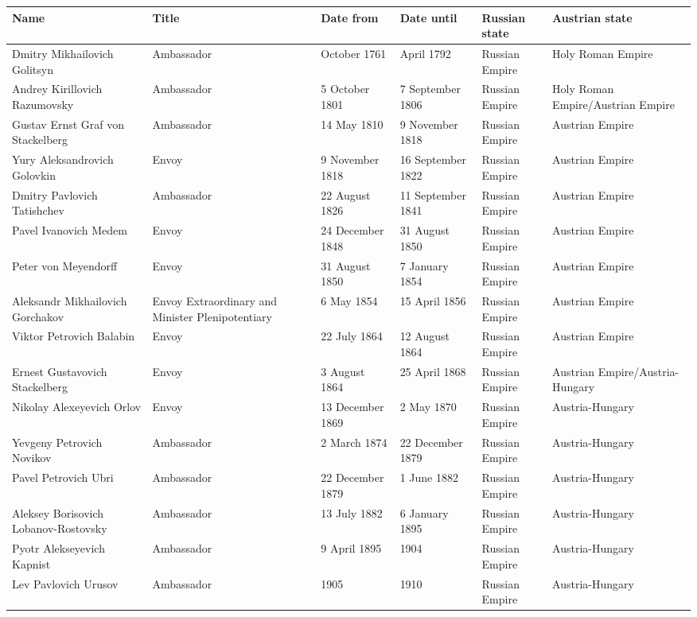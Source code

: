 \documentclass{article}
\begin{document}
\begin{tabular}{llllll}
\toprule
Name & Title & Date from & Date until & Russian state & Austrian state \\
\midrule
Dmitry Mikhailovich Golitsyn & Ambassador & October 1761 & April 1792 & Russian Empire & Holy Roman Empire \\
Andrey Kirillovich Razumovsky & Ambassador & 5 October 1801 & 7 September 1806 & Russian Empire & Holy Roman Empire/Austrian Empire \\
Gustav Ernst Graf von Stackelberg & Ambassador & 14 May 1810 & 9 November 1818 & Russian Empire & Austrian Empire \\
Yury Aleksandrovich Golovkin & Envoy & 9 November 1818 & 16 September 1822 & Russian Empire & Austrian Empire \\
Dmitry Pavlovich Tatishchev & Ambassador & 22 August 1826 & 11 September 1841 & Russian Empire & Austrian Empire \\
Pavel Ivanovich Medem & Envoy & 24 December 1848 & 31 August 1850 & Russian Empire & Austrian Empire \\
Peter von Meyendorff & Envoy & 31 August 1850 & 7 January 1854 & Russian Empire & Austrian Empire \\
Aleksandr Mikhailovich Gorchakov & Envoy Extraordinary and Minister Plenipotentiary & 6 May 1854 & 15 April 1856 & Russian Empire & Austrian Empire \\
Viktor Petrovich Balabin & Envoy & 22 July 1864 & 12 August 1864 & Russian Empire & Austrian Empire \\
Ernest Gustavovich Stackelberg & Envoy & 3 August 1864 & 25 April 1868 & Russian Empire & Austrian Empire/Austria-Hungary \\
Nikolay Alexeyevich Orlov & Envoy & 13 December 1869 & 2 May 1870 & Russian Empire & Austria-Hungary \\
Yevgeny Petrovich Novikov & Ambassador & 2 March 1874 & 22 December 1879 & Russian Empire & Austria-Hungary \\
Pavel Petrovich Ubri & Ambassador & 22 December 1879 & 1 June 1882 & Russian Empire & Austria-Hungary \\
Aleksey Borisovich Lobanov-Rostovsky & Ambassador & 13 July 1882 & 6 January 1895 & Russian Empire & Austria-Hungary \\
Pyotr Alekseyevich Kapnist & Ambassador & 9 April 1895 & 1904 & Russian Empire & Austria-Hungary \\
Lev Pavlovich Urusov & Ambassador & 1905 & 1910 & Russian Empire & Austria-Hungary \\

\end{tabular}
\end{document}
